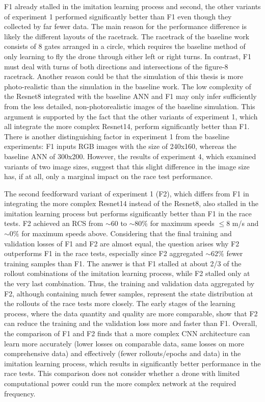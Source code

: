 F1 already stalled in the imitation learning process and second, 
the other variants of experiment 1 performed significantly better than F1 even though they collected by far fewer data. 
The main reason for the performance difference is likely the different layouts of the racetrack. 
The racetrack of the baseline work consists of 8 gates arranged in a circle, 
which requires the baseline method of only learning to fly the drone through either left or right turns. 
In contrast, F1 must deal with turns of both directions and intersections of the figure-8 racetrack. 
Another reason could be that the simulation of this thesis is more photo-realistic 
than the simulation in the baseline work. The low complexity of the Resnet8 integrated 
with the baseline ANN and F1 may only infer sufficiently from the less detailed, non-photorealistic 
images of the baseline simulation. 
This argument is supported by the fact that the other variants of experiment 1, 
which all integrate the more complex Resnet14, perform significantly better than F1. 
There is another distinguishing factor in experiment 1 from the baseline experiments: 
F1 inputs RGB images with the size of 240x160, whereas the baseline ANN of 300x200. 
However, the results of experiment 4, which examined variants of two image sizes, 
suggest that this slight difference in the image size has, if at all, only a marginal impact on the race test performance.



The second feedforward variant of experiment 1 (F2), 
which differs from F1 in integrating the more complex Resnet14 instead of the Resnet8, 
also stalled in the imitation learning process but performs significantly better than F1 in the race tests. 
F2 achieved an RCS from $\sim 60$ to $\sim 80\%$ for maximum speeds $\le 8$ m/s and $\sim 0\%$ for maximum speeds above. 
Considering that the final training and validation losses of F1 and F2 are almost equal, 
the question arises why F2 outperforms F1 in the race tests, 
especially since F2 aggregated $\sim 62\%$ fewer training samples than F1. 
The answer is that F1 stalled at about 2/3 of the rollout combinations of the imitation learning process, 
while F2 stalled only at the very last combination. 
Thus, the training and validation data aggregated by F2, 
although containing much fewer samples, represent the state distribution at the rollouts of the race tests more closely. 
The early stages of the learning process, where the data quantity and quality are more comparable, 
show that F2 can reduce the training and the validation loss more and faster than F1. 
Overall, the comparison of F1 and F2 finds that a more complex CNN architecture 
can learn more accurately (lower losses on comparable data, same losses on more comprehensive data) 
and effectively (fewer rollouts/epochs and data) 
in the imitation learning process, 
which results in significantly better performance in the race tests. 
This comparison does not consider whether a drone with limited computational power 
could run the more complex network at the required frequency.



